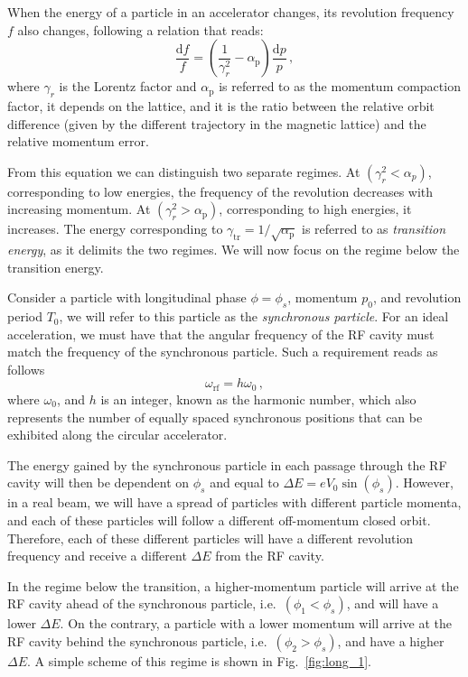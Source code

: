 When the energy of a particle in an accelerator changes, its revolution frequency $f$ also changes, following a relation that reads:
\begin{equation}
    \frac{\mathrm{d} f}{f}=\left(\frac{1}{\gamma_r^2}-\alpha_{\mathrm{p}}\right) \frac{\mathrm{d} p}{p}\,,
\end{equation}
where $\gamma_r$ is the Lorentz factor and $\alpha_{\mathrm{p}}$ is referred to as the momentum compaction factor, it depends on the lattice, and it is the ratio between the relative orbit difference (given by the different trajectory in the magnetic lattice)  and the relative momentum error.

From this equation we can distinguish two separate regimes. At $\left(\gamma_r^2<\alpha_p\right)$, corresponding to low energies, the frequency of the revolution decreases with increasing momentum. At $\left(\gamma_r^2>\alpha_{\mathrm{p}}\right)$, corresponding to high energies, it increases. The energy corresponding to $\gamma_{\mathrm{tr}}=1 / \sqrt{\alpha_{\mathrm{p}}}$ is referred to as \textit{transition energy}, as it delimits the two regimes. We will now focus on the regime below the transition energy.

Consider a particle with longitudinal phase $\phi=\phi_s$, momentum $p_0$, and revolution period $T_0$, we will refer to this particle as the \textit{synchronous particle}. For an ideal acceleration, we must have that the angular frequency of the RF cavity must match the frequency of the synchronous particle. Such a requirement reads as follows
\begin{equation}
    \omega_{\mathrm{rf}}=h \omega_0\,,
\end{equation}
where $\omega_0$, and $h$ is an integer, known as the harmonic number, which also represents the number of equally spaced synchronous positions that can be exhibited along the circular accelerator.

The energy gained by the synchronous particle in each passage through the RF cavity will then be dependent on $\phi_s$ and equal to $\Delta E=e V_0 \sin \left(\phi_s\right)$. However, in a real beam, we will have a spread of particles with different particle momenta, and each of these particles will follow a different off-momentum closed orbit. Therefore, each of these different particles will have a different revolution frequency and receive a different $\Delta E$ from the RF cavity.

In the regime below the transition, a higher-momentum particle will arrive at the RF cavity ahead of the synchronous particle, i.e.\ $\left(\phi_1<\phi_s\right)$, and will have a lower $\Delta E$. On the contrary, a particle with a lower momentum will arrive at the RF cavity behind the synchronous particle, i.e.\ $\left(\phi_2>\phi_s\right)$, and have a higher $\Delta E$. A simple scheme of this regime is shown in Fig.~\ref{fig:long_1}.

